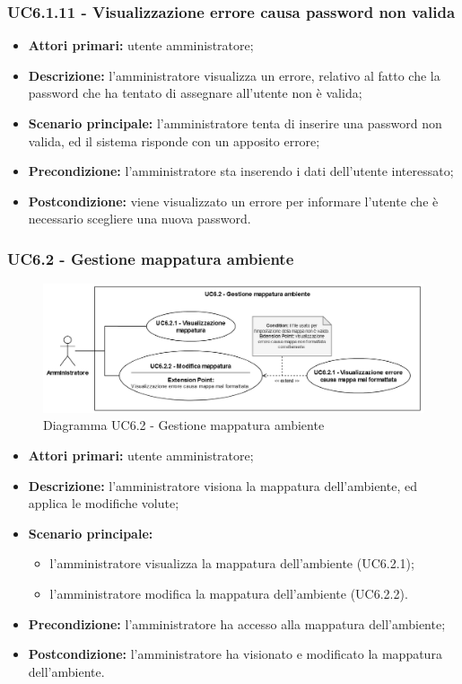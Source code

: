 \subsubsection{UC6.1.11 - Visualizzazione errore causa password non valida}
	\begin{itemize}
		\item \textbf{Attori primari:} utente amministratore;
		\item \textbf{Descrizione:} l'amministratore visualizza un errore, relativo al fatto che la password che ha tentato di assegnare all'utente non è valida;
		\item \textbf{Scenario principale:} l'amministratore tenta di inserire una password non valida, ed il sistema risponde con un apposito errore;
		\item \textbf{Precondizione:} l'amministratore sta inserendo i dati dell'utente interessato;
		\item \textbf{Postcondizione:} viene visualizzato un errore per informare l'utente che è necessario scegliere una nuova password.
	\end{itemize}

\subsubsection{UC6.2 - Gestione mappatura ambiente}
	\begin{figure}[H]
		\centering
		\includegraphics[width=16cm]{images/UC6.2.png}
		\caption{Diagramma UC6.2 - Gestione mappatura ambiente}
	\end{figure}
	\begin{itemize}
		\item \textbf{Attori primari:} utente amministratore;
		\item \textbf{Descrizione:} l'amministratore visiona la mappatura dell'ambiente, ed applica le modifiche volute;
		\item \textbf{Scenario principale:} 
			\begin{itemize}
				\item l'amministratore visualizza la mappatura dell'ambiente (UC6.2.1);
				\item l'amministratore modifica la mappatura dell'ambiente (UC6.2.2).
			\end{itemize}
		\item \textbf{Precondizione:} l'amministratore ha accesso alla mappatura dell'ambiente;
		\item \textbf{Postcondizione:} l'amministratore ha visionato e modificato la mappatura dell'ambiente.
	\end{itemize}


